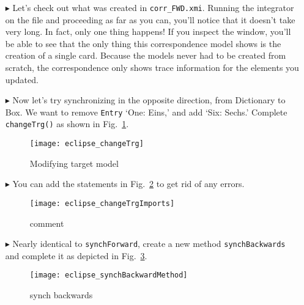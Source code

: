 \begin{itemize}
\item[$\blacktriangleright$] Let's check out what was created in \texttt{corr\_FWD.xmi}. Running the integrator on the file and proceeding as far as you can,
you'll notice that it doesn't take very long. In fact, only one thing happens! If you inspect the window, you'll be able to see that the only thing this
correspondence model shows is the creation of a single card. Because the models never had to be created from scratch, the correspondence only shows trace
information for the elements you updated.

\newpage

\item[$\blacktriangleright$] Now let's try synchronizing in the opposite direction, from Dictionary to Box. We want to remove \texttt{Entry} `One: Eins,' and
add `Six: Sechs.' Complete \texttt{changeTrg()} as shown in Fig.~\ref{eclipse:changeTrg}.

\vspace{0.5cm}

\begin{figure}[htbp]
\begin{center}
  \texttt{[image: eclipse\_changeTrg]}
  \caption{Modifying target model}
  \label{eclipse:changeTrg}
\end{center}
\end{figure}

\item[$\blacktriangleright$] You can add the statements in Fig.~\ref{eclipse:changeTrgImports} to get rid of any errors.

\vspace{0.5cm}

\begin{figure}[htbp]
\begin{center}
  \texttt{[image: eclipse\_changeTrgImports]}
  \caption{comment}
  \label{eclipse:changeTrgImports}
\end{center}
\end{figure}

\item[$\blacktriangleright$] Nearly identical to \texttt{synchForward}, create a new method \texttt{synchBackwards} and complete it as depicted in
Fig.~\ref{eclipse:SynchBackwardMethod}.

\begin{figure}[htbp]
\begin{center}
  \texttt{[image: eclipse\_synchBackwardMethod]}
  \caption{synch backwards}
  \label{eclipse:SynchBackwardMethod}
\end{center}
\end{figure}


\end{itemize}
